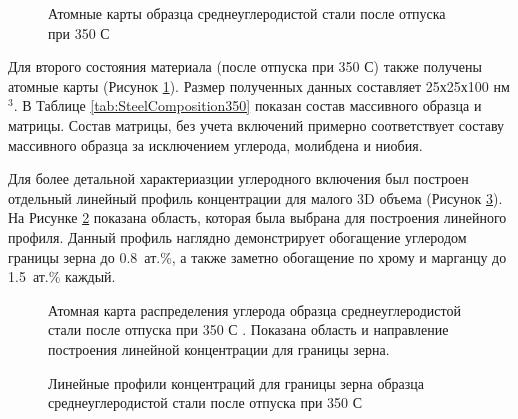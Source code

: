 \begin{figure}[htb]
	\caption{Атомные карты образца среднеуглеродистой стали после отпуска при 350 \textdegree С \cite{scbibRyabov}}
	\label{fig:SteelAtomMaps2}
\end{figure}

Для второго состояния материала (после отпуска при 350 \textdegree С) также получены атомные карты (Рисунок \cref{fig:SteelAtomMaps2}). Размер полученных данных составляет 25х25х100 нм$^{3}$. В Таблице \cref{tab:SteelComposition350} показан состав массивного образца и матрицы. Состав матрицы, без учета включений примерно соответствует составу массивного образца за исключением углерода, молибдена и ниобия. 

Для более детальной характериазции углеродного включения был построен отдельный линейный профиль концентрации для малого 3D объема (Рисунок \cref{fig:SteelLinear2}). На Рисунке \cref{fig:SteelAtomMapsLin} показана область, которая была выбрана для построения линейного профиля. Данный профиль наглядно демонстрирует обогащение углеродом границы зерна до 0.8~ат.\%, а также заметно обогащение по хрому и марганцу до 1.5~ат.\% каждый.

\begin{figure}[htb]
	\caption{Атомная карта распределения углерода образца среднеуглеродистой стали после отпуска при 350 \textdegree С \cite{scbibRyabov}. Показана область и направление построения линейной концентрации для границы зерна.}
	\label{fig:SteelAtomMapsLin}
\end{figure}

\begin{figure}[htb]
	\caption{Линейные профили концентраций для границы зерна образца среднеуглеродистой стали после отпуска при 350 \textdegree С \cite{scbibRyabov}}
	\label{fig:SteelLinear2}
\end{figure}

